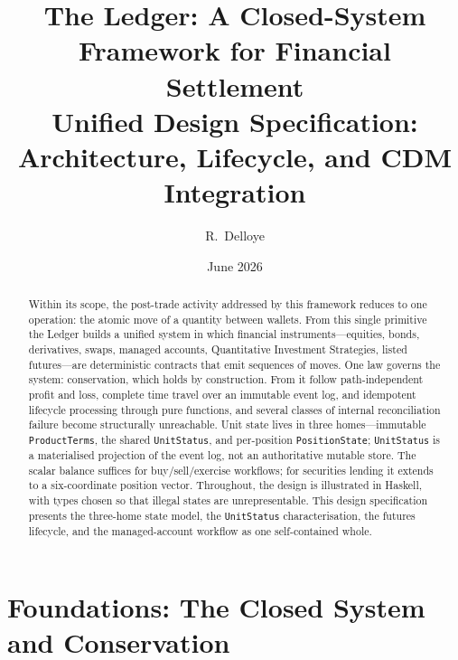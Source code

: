 \documentclass[11pt,a4paper]{article}
\title{The Ledger: A Closed-System Framework for Financial Settlement\\[6pt]
\large Unified Design Specification: Architecture, Lifecycle, and CDM Integration}
\author{R.\ Delloye}
\date{June 2026}
\begin{document}
\maketitle



\begin{abstract}
Within its scope, the post-trade activity addressed by this framework reduces to one operation: the
atomic move of a quantity between wallets. From this single primitive the Ledger builds a unified system
in which financial instruments---equities, bonds, derivatives, swaps, managed accounts, Quantitative
Investment Strategies, listed futures---are deterministic contracts that emit sequences of moves. One law
governs the system: conservation, which holds by construction. From it follow path-independent profit and
loss, complete time travel over an immutable event log, and idempotent lifecycle processing through pure
functions, and several classes of internal reconciliation failure become structurally unreachable. Unit
state lives in three homes---immutable \texttt{ProductTerms}, the shared \texttt{UnitStatus}, and
per-position \texttt{PositionState}; \texttt{UnitStatus} is a materialised projection of the event log,
not an authoritative mutable store. The scalar balance suffices for buy/sell/exercise workflows; for
securities lending it extends to a six-coordinate position vector. Throughout, the design is illustrated
in Haskell, with types chosen so that illegal states are unrepresentable. This design
specification presents the three-home state model, the \texttt{UnitStatus} characterisation,
the futures lifecycle, and the managed-account workflow as one self-contained whole.
\end{abstract}

\tableofcontents
\clearpage



\clearpage

\part{Foundations: The Closed System and Conservation}




\end{document}
